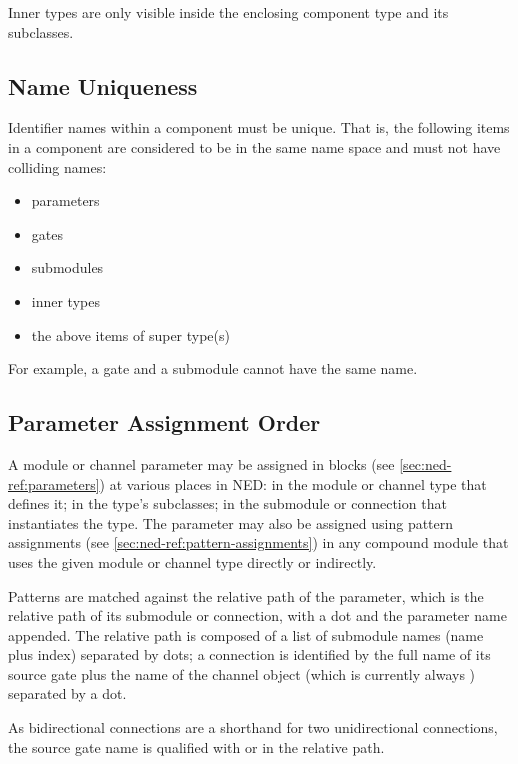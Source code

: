 Inner types are only visible inside the enclosing component type
and its subclasses.



\subsection{Name Uniqueness}
\label{sec:ned-ref:name-uniqueness}

Identifier names within a component must be unique. That is, the following
items in a component are considered to be in the same name space and must
not have colliding names:

\begin{itemize}
  \item parameters
  \item gates
  \item submodules
  \item inner types
  \item the above items of super type(s)
\end{itemize}

For example, a gate and a submodule cannot have the same name.


\subsection{Parameter Assignment Order}
\label{sec:ned-ref:param-assignment-order}

A module or channel parameter may be assigned in 
blocks (see \ref{sec:ned-ref:parameters}) at various places in NED: in
the module or channel type that defines it; in the type's subclasses; in
the submodule or connection that instantiates the type. The parameter may
also be assigned using pattern assignments (see
\ref{sec:ned-ref:pattern-assignments}) in any compound module that uses
the given module or channel type directly or indirectly.

Patterns are matched against the relative path of the parameter, which is
the relative path of its submodule or connection, with a dot and the
parameter name appended. The relative path is composed of a list of
submodule names (name plus index) separated by dots; a connection is
identified by the full name of its source gate plus the name of the channel
object (which is currently always ) separated by a dot.

\begin{note}
As bidirectional connections are a shorthand for two unidirectional
connections, the source gate name is qualified with  or
 in the relative path.
\end{note}

